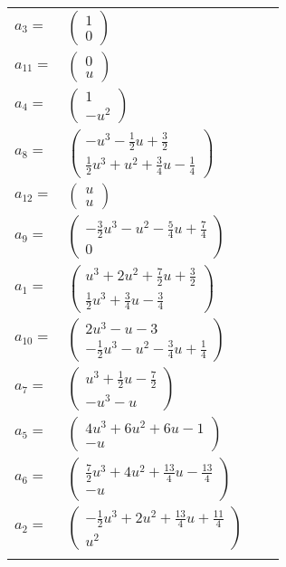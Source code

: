 \documentclass[1p]{elsarticle_modified}
\theoremstyle{definition}
\begin{document}
\begin{tabular}{m{7pt} m{180pt} m{7pt} m{180pt} }
\flushright $a_{3}=$&$\begin{pmatrix}1\\0\end{pmatrix}$ \\
\flushright $a_{11}=$&$\begin{pmatrix}0\\u\end{pmatrix}$ \\
\flushright $a_{4}=$&$\begin{pmatrix}1\\- u^2\end{pmatrix}$ \\
\flushright $a_{8}=$&$\begin{pmatrix}- u^3-\frac{1}{2} u+\frac{3}{2}\\\frac{1}{2} u^3+u^2+\frac{3}{4} u-\frac{1}{4}\end{pmatrix}$ \\
\flushright $a_{12}=$&$\begin{pmatrix}u\\u\end{pmatrix}$ \\
\flushright $a_{9}=$&$\begin{pmatrix}-\frac{3}{2} u^3- u^2-\frac{5}{4} u+\frac{7}{4}\\0\end{pmatrix}$ \\
\flushright $a_{1}=$&$\begin{pmatrix}u^3+2 u^2+\frac{7}{2} u+\frac{3}{2}\\\frac{1}{2} u^3+\frac{3}{4} u-\frac{3}{4}\end{pmatrix}$ \\
\flushright $a_{10}=$&$\begin{pmatrix}2 u^3- u-3\\-\frac{1}{2} u^3- u^2-\frac{3}{4} u+\frac{1}{4}\end{pmatrix}$ \\
\flushright $a_{7}=$&$\begin{pmatrix}u^3+\frac{1}{2} u-\frac{7}{2}\\- u^3- u\end{pmatrix}$ \\
\flushright $a_{5}=$&$\begin{pmatrix}4 u^3+6 u^2+6 u-1\\- u\end{pmatrix}$ \\
\flushright $a_{6}=$&$\begin{pmatrix}\frac{7}{2} u^3+4 u^2+\frac{13}{4} u-\frac{13}{4}\\- u\end{pmatrix}$ \\
\flushright $a_{2}=$&$\begin{pmatrix}-\frac{1}{2} u^3+2 u^2+\frac{13}{4} u+\frac{11}{4}\\u^2\end{pmatrix}$\\&\end{tabular}
\end{document}

